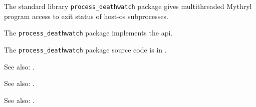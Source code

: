 
The standard library {\tt process\_deathwatch} package gives multithreaded Mythryl program access to exit status of host-os subprocesses.

The {\tt process\_deathwatch} package implements the  api.

The {\tt process\_deathwatch} package source code is in .

See also: .

See also: .

See also: .
